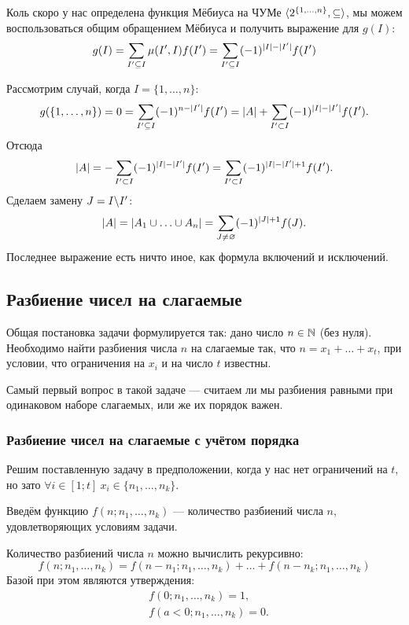 Коль скоро у нас определена функция Мёбиуса на ЧУМе $\langle2^{\{1, \ldots, n\}}, \subseteq\rangle$, мы можем воспользоваться общим обращением Мёбиуса и получить выражение для $g(I)$:
\[
	g(I) = \sum\limits_{I' \subseteq I} \mu(I', I) f(I') = \sum\limits_{I' \subseteq I} (-1)^{|I| - |I'|} f(I')
\]

Рассмотрим случай, когда $I = \{1, \ldots, n\}$:
\[
	g(\{1, \ldots, n\}) = 0 = \sum\limits_{I' \subseteq I} (-1)^{n - |I'|} f(I') = |A| + \sum\limits_{I' \subset I} (-1)^{|I| - |I'|} f(I').
\]
Отсюда
\[
	|A| = -\sum\limits_{I' \subset I} (-1)^{|I| - |I'|} f(I') = \sum\limits_{I' \subset I} (-1)^{|I| - |I'| + 1} f(I').
\]
Сделаем замену $J = I \backslash I'$:
\[
	|A| = |A_1 \cup \ldots \cup A_n| = \sum\limits_{J \neq \varnothing} (-1)^{|J| + 1} f(J).
\]
Последнее выражение есть ничто иное, как формула включений и исключений.

\subsection{Разбиение чисел на слагаемые}

Общая постановка задачи формулируется так:
дано число $n \in \mathbb{N}$ (без нуля). Необходимо найти разбиения числа $n$ на слагаемые так, что $n = x_1 + \ldots + x_t$, при условии, что ограничения на $x_i$ и на число $t$ известны.

Самый первый вопрос в такой задаче --- считаем ли мы разбиения равными при одинаковом наборе слагаемых, или же их порядок важен.

\subsubsection*{Разбиение чисел на слагаемые с учётом порядка}

Решим поставленную задачу в предположении, когда у нас нет ограничений на $t$, но зато $\forall i \in [1; t]\ x_i \in \{n_1, \ldots, n_k\}$.

Введём функцию $f(n; n_1, \ldots, n_k)$ --- количество разбиений числа $n$, удовлетворяющих условиям задачи.

\begin{theorem} \label{partOrd}
	Количество разбиений числа $n$ можно вычислить рекурсивно:
	\[
		f(n; n_1, \ldots, n_k) = f(n - n_1; n_1, \ldots, n_k) + \ldots + f(n - n_k; n_1, \ldots, n_k)
	\]
	Базой при этом являются утверждения:
	\begin{align*}
		&f(0; n_1, \ldots, n_k) = 1,
		\\
		&f(a < 0; n_1, \ldots, n_k) = 0.
	\end{align*}
\end{theorem}

